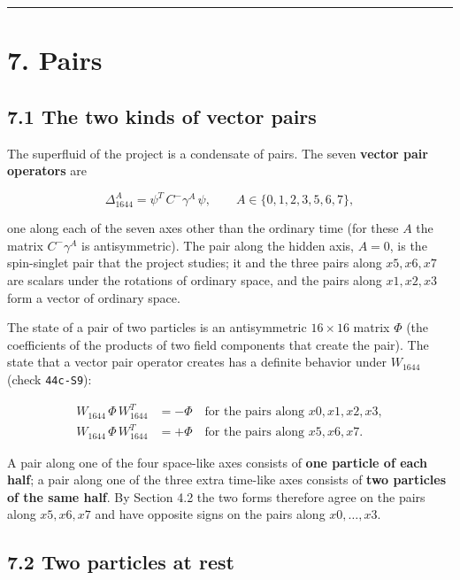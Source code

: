 \documentclass[
  10pt,
]{article}
\begin{document}
\begin{center}\rule{0.5\linewidth}{0.5pt}\end{center}

\hypertarget{pairs}{%
\section{7. Pairs}\label{pairs}}

\hypertarget{the-two-kinds-of-vector-pairs}{%
\subsection{7.1 The two kinds of vector
pairs}\label{the-two-kinds-of-vector-pairs}}

The superfluid of the project is a condensate of pairs. The seven
\textbf{vector pair operators} are

\[\Delta_{1644}^{A}=\psi^T\,C^-\gamma^A\,\psi,\qquad A\in\{0,1,2,3,5,6,7\},\]

one along each of the seven axes other than the ordinary time (for these
\(A\) the matrix \(C^-\gamma^A\) is antisymmetric). The pair along the
hidden axis, \(A=0\), is the spin-singlet pair that the project studies;
it and the three pairs along \(x5,x6,x7\) are scalars under the
rotations of ordinary space, and the pairs along \(x1,x2,x3\) form a
vector of ordinary space.

The state of a pair of two particles is an antisymmetric \(16\times16\)
matrix \(\Phi\) (the coefficients of the products of two field
components that create the pair). The state that a vector pair operator
creates has a definite behavior under \(W_{1644}\) (check
\texttt{44c-S9}):

\[\begin{aligned}
W_{1644}\,\Phi\,W_{1644}^T&=-\Phi\quad\text{for the pairs along }x0,x1,x2,x3,\\
W_{1644}\,\Phi\,W_{1644}^T&=+\Phi\quad\text{for the pairs along }x5,x6,x7.
\end{aligned}\tag{7.1}\]

A pair along one of the four space-like axes consists of \textbf{one
particle of each half}; a pair along one of the three extra time-like
axes consists of \textbf{two particles of the same half}. By Section 4.2
the two forms therefore agree on the pairs along \(x5,x6,x7\) and have
opposite signs on the pairs along \(x0,\dots,x3\).

\hypertarget{two-particles-at-rest}{%
\subsection{7.2 Two particles at rest}\label{two-particles-at-rest}}
\end{document}
